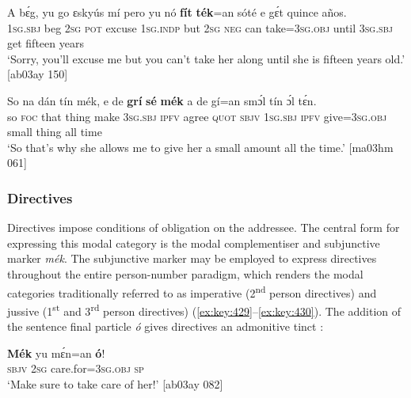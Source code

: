 \ea%
    \label{ex:key:426}
    \gll A    bɛ́g,    yu  go  ɛskyús  mí    pero  yu  nó  \textbf{fít}
\textbf{ték}=an    sóté    e    gɛ́t  quince  años.\\
\textsc{1sg.sbj}  beg    \textsc{2sg}  \textsc{pot}  excuse  \textsc{1sg.indp}  but    \textsc{2sg}  \textsc{neg}  can
take=\textsc{3sg.obj}  until  \textsc{3sg.sbj}  get  fifteen  years\\

\glt ‘Sorry, you’ll excuse me but you can’t take her along until she is fifteen
years old.’ [ab03ay 150]
\z


\ea%
    \label{ex:key:427}
    \gll So  na  dán  tín    mék,  e    de  \textbf{grí}    \textbf{sé}    \textbf{mék}  
a    de  gí=an    smɔ́l  tín    ɔ́l  tɛ́n.\\
so  \textsc{foc}  that  thing  make  \textsc{3sg.sbj}  \textsc{ipfv}  agree  \textsc{quot}    \textsc{sbjv}  
\textsc{1sg.sbj}  \textsc{ipfv}  give\textsc{=3sg.obj}  small  thing  all  time\\

\glt ‘So that’s why she allows me to give her a small amount all the time.’ [ma03hm 061]
\z

\subsubsection{Directives}\label{sec:6.7.3.3}

Directives impose conditions of obligation on the addressee. The central form for expressing this modal category is the modal complementiser and subjunctive marker \textit{mék}. The subjunctive marker may be employed to express directives throughout the entire person-number paradigm, which renders the modal categories traditionally referred to as imperative (2\textsuperscript{nd} person directives)  and jussive (1\textsuperscript{st} and 3\textsuperscript{rd} person directives) (\ref{ex:key:429}–\ref{ex:key:430}). The addition of the sentence final particle \textit{ó} gives directives an admonitive tinct :


\ea%
    \label{ex:key:428}
    \gll \textbf{Mék}    yu  mɛ́n=an      \textbf{ó}!\\
\textsc{sbjv}    \textsc{2sg}  care.for=\textsc{3sg.obj}  \textsc{sp}\\

\glt ‘Make sure to take care of her!’ [ab03ay 082]
\z


